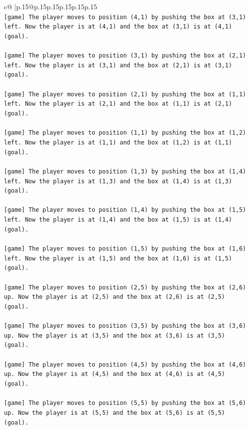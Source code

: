 \documentclass{article}
\begin{document}
{\begin{supertabular}{c@{$\;$}|p{.15\linewidth}@{}p{.15\linewidth}p{.15\linewidth}p{.15\linewidth}p{.15\linewidth}p{.15\linewidth}}
{{{\\ 
\texttt{{[}game{]} The player moves to position (4,1) by pushing the box at (3,1) left. Now the player is at (4,1) and the box at (3,1) is at (4,1) (goal).} \\
\\ 
\texttt{{[}game{]} The player moves to position (3,1) by pushing the box at (2,1) left. Now the player is at (3,1) and the box at (2,1) is at (3,1) (goal).} \\
\\ 
\texttt{{[}game{]} The player moves to position (2,1) by pushing the box at (1,1) left. Now the player is at (2,1) and the box at (1,1) is at (2,1) (goal).} \\
\\ 
\texttt{{[}game{]} The player moves to position (1,1) by pushing the box at (1,2) left. Now the player is at (1,1) and the box at (1,2) is at (1,1) (goal).} \\
\\ 
\texttt{{[}game{]} The player moves to position (1,3) by pushing the box at (1,4) left. Now the player is at (1,3) and the box at (1,4) is at (1,3) (goal).} \\
\\ 
\texttt{{[}game{]} The player moves to position (1,4) by pushing the box at (1,5) left. Now the player is at (1,4) and the box at (1,5) is at (1,4) (goal).} \\
\\ 
\texttt{{[}game{]} The player moves to position (1,5) by pushing the box at (1,6) left. Now the player is at (1,5) and the box at (1,6) is at (1,5) (goal).} \\
\\ 
\texttt{{[}game{]} The player moves to position (2,5) by pushing the box at (2,6) up. Now the player is at (2,5) and the box at (2,6) is at (2,5) (goal).} \\
\\ 
\texttt{{[}game{]} The player moves to position (3,5) by pushing the box at (3,6) up. Now the player is at (3,5) and the box at (3,6) is at (3,5) (goal).} \\
\\ 
\texttt{{[}game{]} The player moves to position (4,5) by pushing the box at (4,6) up. Now the player is at (4,5) and the box at (4,6) is at (4,5) (goal).} \\
\\ 
\texttt{{[}game{]} The player moves to position (5,5) by pushing the box at (5,6) up. Now the player is at (5,5) and the box at (5,6) is at (5,5) (goal).} \\
}}}
\end{supertabular}}
\end{document}

